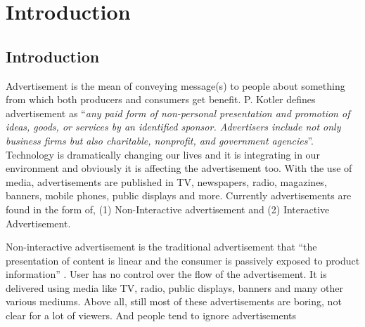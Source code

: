 
\chapter{Introduction} %

\label{Chapter1} %
\newpage



\section{Introduction}
Advertisement is the mean of conveying message(s) to people about something from which both producers and consumers get benefit. P. Kotler \cite{ad_def} defines advertisement as ``\emph{any paid form of non-personal presentation and promotion of ideas, goods, or services by an identified sponsor. Advertisers include not only business firms but also charitable, nonprofit, and government agencies}''. Technology is dramatically changing our lives and it is integrating in our environment and obviously it is affecting the advertisement too. With the use of media, advertisements are published in TV, newspapers, radio, magazines, banners, mobile phones, public displays and more. Currently advertisements are found in the form of, (1) Non-Interactive advertisement and (2) Interactive Advertisement.

Non-interactive advertisement is the traditional advertisement that “the presentation of content is linear and the consumer is passively exposed to product information” \cite{Non_inter_vs_interAd}. User has no control over the flow of the advertisement. It is delivered using media like TV, radio, public displays, banners and many other various mediums. Above all, still most of these advertisements are boring, not clear for a lot of viewers. And people tend to ignore advertisements \cite{display_blindness, banner_blindness}

